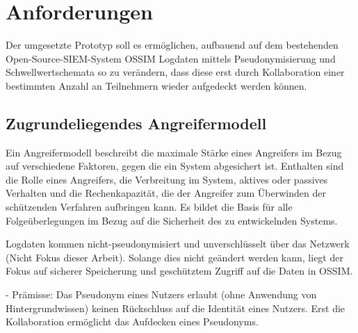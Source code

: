 \section{Anforderungen}

\label{sec_impl_requirements}

Der umgesetzte Prototyp soll es ermöglichen, aufbauend auf dem bestehenden Open-Source-SIEM-System OSSIM Logdaten mittels Pseudonymisierung und Schwellwertschemata so zu verändern, dass diese erst durch Kollaboration einer bestimmten Anzahl an Teilnehmern wieder aufgedeckt werden können.






\subsection*{Zugrundeliegendes Angreifermodell}





Ein Angreifermodell beschreibt die maximale Stärke eines Angreifers im Bezug auf verschiedene Faktoren, gegen die ein System abgesichert ist. Enthalten sind die Rolle eines Angreifers, die Verbreitung im System, aktives oder passives Verhalten und die Rechenkapazität, die der Angreifer zum Überwinden der schützenden Verfahren aufbringen kann. Es bildet die Basis für alle Folgeüberlegungen im Bezug auf die Sicherheit des zu entwickelnden Systems.

Logdaten kommen nicht-pseudonymisiert und unverschlüsselt über das Netzwerk (Nicht Fokus dieser Arbeit). Solange dies nicht geändert werden kann, liegt der Fokus auf sicherer Speicherung und geschütztem Zugriff auf die Daten in OSSIM.

- Prämisse: Das Pseudonym eines Nutzers erlaubt (ohne Anwendung von Hintergrundwissen) keinen Rückschluss auf die Identität eines Nutzers. Erst die Kollaboration ermöglicht das Aufdecken eines Pseudonyms.

